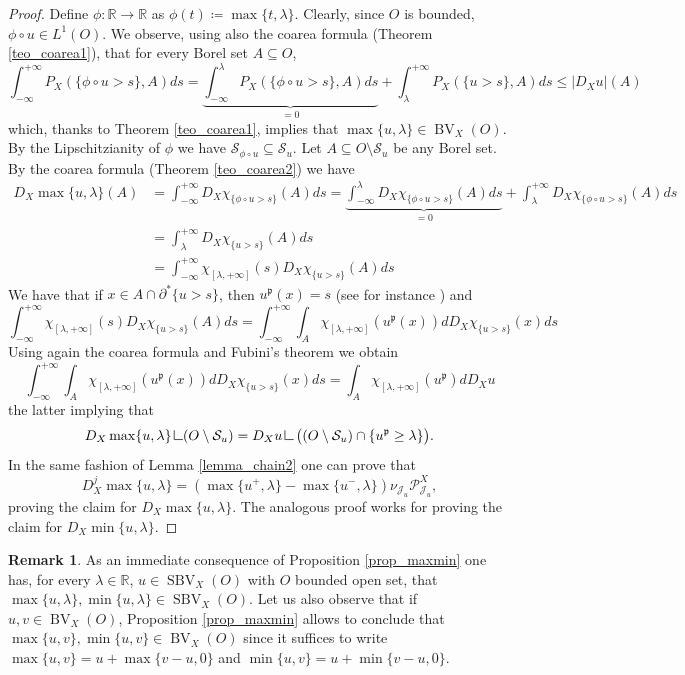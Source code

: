 \documentclass[12pt,a4paper]{amsart}
\theoremstyle{definition}
\newtheorem{rem}[defi]{Remark}
\theoremstyle{plain}
\newcommand{\R}{\mathbb{R}}
\newcommand{\pp}{\partial}
\newcommand{\se}{\subseteq}
\newcommand{\ceq}{\coloneqq}
\newcommand{\pxu}{{\mathcal{P}^X_{\mathcal{J}_u}}}
\newcommand{\res} {\mathop{\hbox{\vrule height 7pt width .5pt depth 0pt \vrule height .5pt width 6pt depth 0pt}}\nolimits}
\newcommand{\sbv}{\operatorname{SBV}}
\newcommand{\bv}{\operatorname{BV}}
\newcommand{\J}{\mathcal{J}}
\newcommand{\s}{\mathcal{S}}
\newcommand{\p}{{\mathfrak{p}}}
\begin{document}
\begin{proof}

Define $\phi:\R \to \R$ as $\phi(t) \ceq \max\{t,\lambda\}$. Clearly, since $O$ is bounded, $\phi \circ u \in L^1(O)$. We observe, using also the coarea formula (Theorem \ref{teo_coarea1}), that for every Borel set $A \se O$,
\[
\int_{-\infty}^{+\infty} P_X(\{\phi \circ u>s \},A)ds=\underbrace{\int_{-\infty}^{\lambda}P_X(\{\phi \circ u>s \},A)ds}_{=0}+\int_{\lambda}^{+\infty}P_X(\{ u>s \},A)ds \leq |D_Xu|(A)
\]
which, thanks to Theorem \ref{teo_coarea1}, implies that $\max\{u,\lambda\} \in  \bv_X(O)$.  By the Lipschitzianity of $\phi$ we have $\s_{\phi \circ u} \se \s_u$. Let $A \se O \setminus \s_u$ be any Borel set. By the coarea formula (Theorem \ref{teo_coarea2}) we have
\begin{align*}
 D_X \max \{u,\lambda\}(A)&=   \int_{-\infty}^{+\infty}D_X \chi_{\{\phi \circ u>s \}}(A)ds=  \underbrace{  \int_{-\infty}^{\lambda}D_X \chi_{\{\phi \circ u>s \}}(A)ds}_{=0}+    \int_{\lambda}^{+\infty}D_X \chi_{\{\phi \circ u>s \}}(A)ds\\
    &=\int_\lambda^{+\infty} D_X \chi_{\{ u>s \}}(A)ds\\
    &=\int_{-\infty}^{+\infty} \chi_{[\lambda,+\infty]}(s) D_X \chi_{\{u>s \}}(A)ds
    \end{align*}
We have that if $x \in A \cap \pp^*\{ u>s \}$, then $u^\p(x)=s$ (see for instance \cite[Proposition 2.22]{dv}) and 
\[
\int_{-\infty}^{+\infty}\chi_{[\lambda,+\infty]}(s)D_X\chi_{\{ u>s \}} (A)ds=\int_{-\infty}^{+\infty}\int_A\chi_{[\lambda,+\infty]}(u^\p(x))dD_X\chi_{\{ u>s \}}(x)ds
\]
Using again the coarea formula and Fubini's theorem we obtain
\[
\int_{-\infty}^{+\infty}\int_A\chi_{[\lambda,+\infty]}(u^\p(x))dD_X\chi_{\{ u>s \}}(x)ds=\int_A \chi_{[\lambda,+\infty]}(u^\p)dD_Xu
\]
the latter implying that 
\[
D_X \max \{u,\lambda \}  \res (O \setminus \s_u)=D_Xu\res \big((O \setminus \s_u) \cap \{u^\p \geq \lambda \} \big).  
\]
In the same fashion of Lemma \ref{lemma_chain2} one can prove that
\[
D_X^j \max \{ u,\lambda\}= (\max\{u^+,\lambda \}-\max\{u^-,\lambda \} )\nu_{\J_u}\pxu,
\]
proving the claim for $D_X \max \{ u,\lambda\}$. The analogous proof works for proving the claim for $D_X \min \{ u,\lambda\}$.


\end{proof}


\begin{rem}\label{rem_maxmin}
    As an immediate consequence of Proposition \ref{prop_maxmin} one has, for every $\lambda \in \R$, $u \in \sbv_X(O)$ with $O$ bounded open set, that $\max\{u,\lambda \}, \min\{u,\lambda \} \in \sbv_X(O)$. Let us also observe that if $u,v \in \bv_X(O)$, Proposition  \ref{prop_maxmin} allows to conclude that  $\max\{ u,v \},\min \{u,v\} \in \bv_X(O) $ since it suffices to write $\max \{ u,v \}=u+\max \{v-u,0\}$ and $\min \{ u,v \}=u+\min \{v-u,0\}$.
\end{rem}
\end{document}
